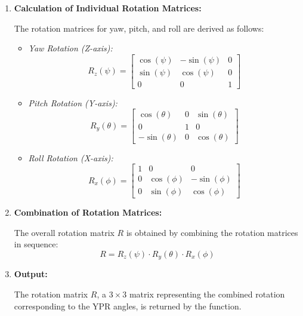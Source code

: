 \begin{enumerate}
    \item \textbf{Calculation of Individual Rotation Matrices:}
    
    The rotation matrices for yaw, pitch, and roll are derived as follows:

    \begin{itemize}
        \item \textit{Yaw Rotation (Z-axis):}
        \begin{equation}
        R_z(\psi) = 
        \begin{bmatrix}
        \cos(\psi) & -\sin(\psi) & 0 \\
        \sin(\psi) & \cos(\psi) & 0 \\
        0 & 0 & 1
        \end{bmatrix}
        \end{equation}
        
        \item \textit{Pitch Rotation (Y-axis):}
        \begin{equation}
        R_y(\theta) = 
        \begin{bmatrix}
        \cos(\theta) & 0 & \sin(\theta) \\
        0 & 1 & 0 \\
        -\sin(\theta) & 0 & \cos(\theta)
        \end{bmatrix}
        \end{equation}

        \item \textit{Roll Rotation (X-axis):}
        \begin{equation}
        R_x(\phi) = 
        \begin{bmatrix}
        1 & 0 & 0 \\
        0 & \cos(\phi) & -\sin(\phi) \\
        0 & \sin(\phi) & \cos(\phi)
        \end{bmatrix}
        \end{equation}
    \end{itemize}
    
    \item \textbf{Combination of Rotation Matrices:}
    
    The overall rotation matrix \( R \) is obtained by combining the rotation matrices in sequence:
    \begin{equation}
    R = R_z(\psi) \cdot R_y(\theta) \cdot R_x(\phi)
    \end{equation}

    \item \textbf{Output:}
    
    The rotation matrix \( R \), a \( 3 \times 3 \) matrix representing the combined rotation corresponding to the YPR angles, is returned by the function.
    
\end{enumerate}

